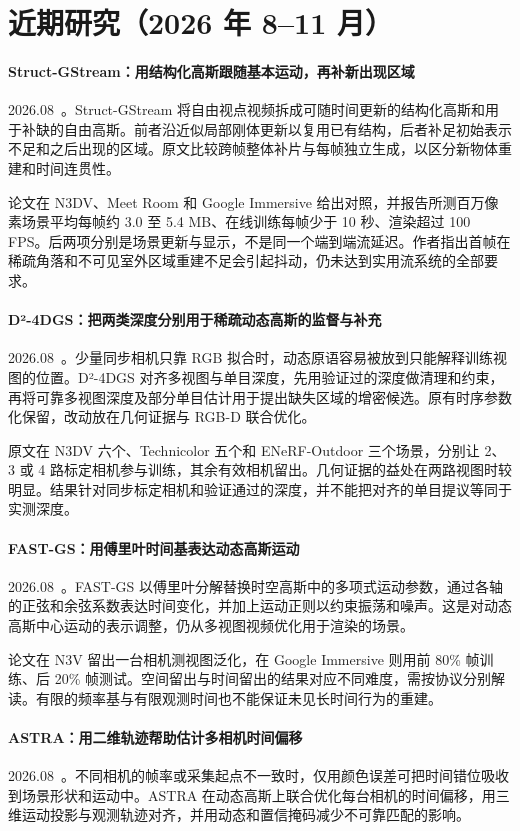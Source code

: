\section{近期研究（2026 年 8--11 月）}
\paragraph{Struct-GStream：用结构化高斯跟随基本运动，再补新出现区域}
2026.08~\cite{2608_01053}。Struct-GStream 将自由视点视频拆成可随时间更新的结构化高斯和用于补缺的自由高斯。前者沿近似局部刚体更新以复用已有结构，后者补足初始表示不足和之后出现的区域。原文比较跨帧整体补片与每帧独立生成，以区分新物体重建和时间连贯性。

论文在 N3DV、Meet Room 和 Google Immersive 给出对照，并报告所测百万像素场景平均每帧约 3.0 至 5.4 MB、在线训练每帧少于 10 秒、渲染超过 100 FPS。后两项分别是场景更新与显示，不是同一个端到端流延迟。作者指出首帧在稀疏角落和不可见室外区域重建不足会引起抖动，仍未达到实用流系统的全部要求。

\paragraph{D²-4DGS：把两类深度分别用于稀疏动态高斯的监督与补充}
2026.08~\cite{2608_01588}。少量同步相机只靠 RGB 拟合时，动态原语容易被放到只能解释训练视图的位置。D²-4DGS 对齐多视图与单目深度，先用验证过的深度做清理和约束，再将可靠多视图深度及部分单目估计用于提出缺失区域的增密候选。原有时序参数化保留，改动放在几何证据与 RGB-D 联合优化。

原文在 N3DV 六个、Technicolor 五个和 ENeRF-Outdoor 三个场景，分别让 2、3 或 4 路标定相机参与训练，其余有效相机留出。几何证据的益处在两路视图时较明显。结果针对同步标定相机和验证通过的深度，并不能把对齐的单目提议等同于实测深度。

\paragraph{FAST-GS：用傅里叶时间基表达动态高斯运动}
2026.08~\cite{2608_01958}。FAST-GS 以傅里叶分解替换时空高斯中的多项式运动参数，通过各轴的正弦和余弦系数表达时间变化，并加上运动正则以约束振荡和噪声。这是对动态高斯中心运动的表示调整，仍从多视图视频优化用于渲染的场景。

论文在 N3V 留出一台相机测视图泛化，在 Google Immersive 则用前 80\% 帧训练、后 20\% 帧测试。空间留出与时间留出的结果对应不同难度，需按协议分别解读。有限的频率基与有限观测时间也不能保证未见长时间行为的重建。

\paragraph{ASTRA：用二维轨迹帮助估计多相机时间偏移}
2026.08~\cite{2608_02006}。不同相机的帧率或采集起点不一致时，仅用颜色误差可把时间错位吸收到场景形状和运动中。ASTRA 在动态高斯上联合优化每台相机的时间偏移，用三维运动投影与观测轨迹对齐，并用动态和置信掩码减少不可靠匹配的影响。

